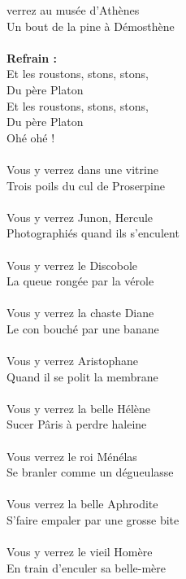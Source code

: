 
 verrez au musée d'Athènes
\\Un bout de la pine à Démosthène
\\\\\textbf{Refrain :}
\\Et les roustons, stons, stons,
\\Du père Platon
\\Et les roustons, stons, stons,
\\Du père Platon
\\Ohé ohé !
\\\\Vous y verrez dans une vitrine
\\Trois poils du cul de Proserpine
\\\\Vous y verrez Junon, Hercule
\\Photographiés quand ils s'enculent
\\\\Vous y verrez le Discobole
\\La queue rongée par la vérole
\\\\Vous y verrez la chaste Diane
\\Le con bouché par une banane
\\\\Vous y verrez Aristophane
\\Quand il se polit la membrane
\\\\Vous y verrez la belle Hélène
\\Sucer Pâris à perdre haleine
\\\\Vous verrez le roi Ménélas
\\Se branler comme un dégueulasse
\\\\Vous verrez la belle Aphrodite
\\S'faire empaler par une grosse bite
\\\\Vous y verrez le vieil Homère
\\En train d'enculer sa belle-mère
